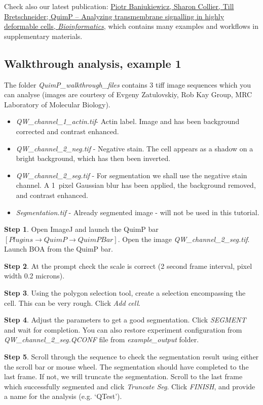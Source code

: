 \documentclass[a4paper,12pt]{article}
\begin{document}
Check also our latest publication: \href{https://doi.org/10.1093/bioinformatics/bty169}{Piotr Baniukiewicz, Sharon Collier, Till Bretschneider; QuimP – Analyzing transmembrane signalling in highly deformable cells, \textit{Bioinformatics}}, which contains many examples and workflows in supplementary materials. 

\subsection{Walkthrough analysis, example 1}
\label{walkthrough}

The folder \emph{QuimP\_walkthrough\_files} contains 3 tiff image sequences which you can
analyse (images are courtesy of Evgeny Zatulovskiy, Rob Kay Group, MRC Laboratory of Molecular Biology).

\begin{itemize}
	\item \textit{QW\_channel\_1\_actin.tif}- Actin label.  Image and has been background corrected and contrast enhanced.
	\item \textit{QW\_channel\_2\_neg.tif} - Negative stain.  The cell appears as a shadow on a bright
	background, which has then been inverted.
	\item \textit{QW\_channel\_2\_seg.tif} - For segmentation we shall use the negative stain channel.  
	A 1~pixel Gaussian blur has been applied, the background removed, and contrast enhanced.  
	\item \textit{Segmentation.tif} - Already segmented image - will not be used in this tutorial.
\end{itemize}

\textbf{Step 1}. Open ImageJ and launch the QuimP bar $[Plugins\rightarrow QuimP\rightarrow QuimP Bar]$.  Open the image \textit{QW\_channel\_2\_seg.tif}.  Launch BOA from the QuimP bar.

\textbf{Step 2}. At the prompt check the scale is correct (2 second frame interval, pixel width 0.2 microns).

\textbf{Step 3}. Using the polygon selection tool, create a selection encompassing the cell. This can be very rough.
Click \emph{Add cell}.

\textbf{Step 4}.  Adjust the parameters to get a good segmentation.  Click \emph{SEGMENT} and wait for completion. You can also restore experiment configuration from \textit{QW\_channel\_2\_seg.QCONF} file from \textit{example\_output} folder.

\textbf{Step 5}. Scroll through the sequence to check the segmentation result using either the scroll bar or mouse
wheel. The segmentation should have completed to the last frame.  If not, we will truncate the segmentation.
Scroll to the last frame which successfully segmented and click \emph{Truncate Seg}.
Click \emph{FINISH}, and provide a name for the analysis (e.g. `QTest').
\end{document}
